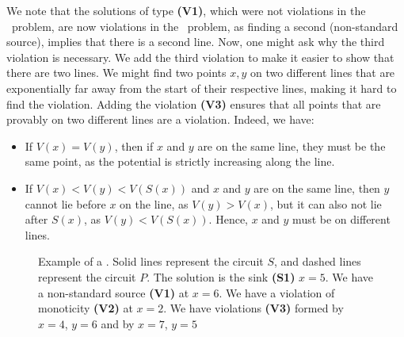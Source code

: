 
We note that the solutions of type \textbf{(V1)}, which were not violations in the \EndOfPotentialLine\ problem, are now violations in the \UniqueEndOfPotentialLine\ problem, as finding a second (non-standard source), implies that there is a second line. Now, one might ask why the third violation is necessary. We add the third violation to make it easier to show that there are two lines. We might find two points $x, y$ on two different lines that are exponentially far away from the start of their respective lines, making it hard to find the violation. Adding the violation \textbf{(V3)} ensures that all points that are provably on two different lines are a violation. Indeed, we have:
\begin{itemize}
	\item If $V(x) = V(y)$, then if $x$ and $y$ are on the same line, they must be the same point, as the potential is strictly increasing along the line.
	\item If $V(x) < V(y) < V(S(x))$ and $x$ and $y$ are on the same line, then $y$ cannot lie before $x$ on the line, as $V(y) > V(x)$, but it can also not lie after $S(x)$, as $V(y) < V(S(x))$. Hence, $x$ and $y$ must be on different lines.
\end{itemize}

\begin{figure}[ht]
	\centering
	\caption[Example of a \UEOPL\ Problem]{Example of a \UniqueEndOfPotentialLine\@. Solid lines represent the circuit $S$, and dashed lines represent the circuit $P$. The solution is the sink \textbf{(S1)} $x=5$. We have a non-standard source \textbf{(V1)} at $x=6$. We have a violation of monoticity \textbf{(V2)} at $x=2$. We have violations \textbf{(V3)} formed by $x=4$, $y=6$ and by $x=7$, $y=5$}\label{fig:ueopl_example}
\end{figure}

